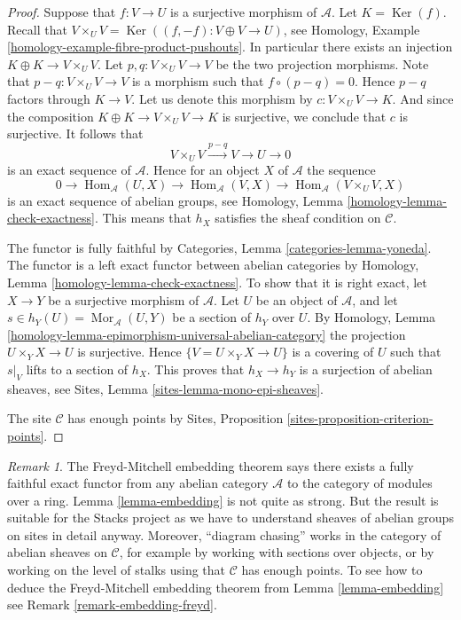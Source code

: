 \documentclass{stacks-project}
\theoremstyle{plain}
\theoremstyle{definition}
\theoremstyle{remark}
\newtheorem{remark}[subsection]{Remark}
\numberwithin{equation}{subsection}
\def\Hom{\mathop{\mathrm{Hom}}\nolimits}
\def\Mor{\mathop{\mathrm{Mor}}\nolimits}
\def\Ker{\mathop{\mathrm{Ker}}}
\begin{document}
\begin{proof}
Suppose that $f : V \to U$ is a surjective morphism of $\mathcal{A}$.
Let $K = \Ker(f)$. Recall that
$V \times_U V = \Ker((f, -f) : V \oplus V \to U)$, see
Homology, Example \ref{homology-example-fibre-product-pushouts}.
In particular there exists an injection $K \oplus K \to V \times_U V$.
Let $p, q : V \times_U V \to V$ be the two projection morphisms.
Note that $p - q : V \times_U V \to V$ is a morphism such that
$f \circ (p  - q) = 0$. Hence $p - q$ factors through $K \to V$.
Let us denote this morphism by $c : V \times_U V \to K$.
And since the composition $K \oplus K \to V \times_U V \to K$
is surjective, we conclude that $c$ is surjective. It follows that
$$
V \times_U V \xrightarrow{p - q} V \to U \to 0
$$
is an exact sequence of $\mathcal{A}$.
Hence for an object $X$ of $\mathcal{A}$ the sequence
$$
0 \to
\Hom_\mathcal{A}(U, X) \to
\Hom_\mathcal{A}(V, X) \to
\Hom_\mathcal{A}(V \times_U V, X)
$$
is an exact sequence of abelian groups, see
Homology, Lemma \ref{homology-lemma-check-exactness}.
This means that $h_X$ satisfies the sheaf condition
on $\mathcal{C}$.

\medskip\noindent
The functor is fully faithful by
Categories, Lemma \ref{categories-lemma-yoneda}.
The functor is a left exact functor between abelian categories by
Homology, Lemma \ref{homology-lemma-check-exactness}.
To show that it is right exact, let $X \to Y$ be a surjective morphism
of $\mathcal{A}$. Let $U$ be an object of $\mathcal{A}$, and let
$s \in h_Y(U) = \Mor_\mathcal{A}(U, Y)$ be a section of $h_Y$
over $U$. By
Homology, Lemma \ref{homology-lemma-epimorphism-universal-abelian-category}
the projection $U \times_Y X \to U$ is surjective.
Hence $\{V = U \times_Y X \to U\}$ is a covering of $U$ such that
$s|_V$ lifts to a section of $h_X$. This proves that
$h_X \to h_Y$ is a surjection of abelian sheaves, see
Sites, Lemma \ref{sites-lemma-mono-epi-sheaves}.

\medskip\noindent
The site $\mathcal{C}$ has enough points by
Sites, Proposition \ref{sites-proposition-criterion-points}.
\end{proof}

\begin{remark}
\label{remark-embedding}
The Freyd-Mitchell embedding theorem says there exists a fully faithful
exact functor from any abelian category $\mathcal{A}$
to the category of modules over a ring.
Lemma \ref{lemma-embedding}
is not quite as strong. But the result is suitable for the
Stacks project as we have to understand sheaves of abelian groups on
sites in detail anyway. Moreover, ``diagram chasing'' works in the category
of abelian sheaves on $\mathcal{C}$, for example by working with sections over
objects, or by working on the level of stalks using that $\mathcal{C}$ has
enough points. To see how to deduce the Freyd-Mitchell embedding theorem from
Lemma \ref{lemma-embedding}
see
Remark \ref{remark-embedding-freyd}.
\end{remark}
\end{document}
